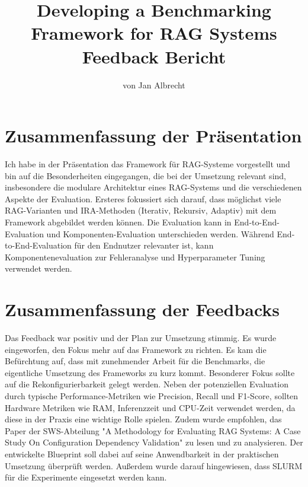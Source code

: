 \documentclass[letterpaper, 10 pt, conference]{ieeeconf}
\title{\LARGE \bf
Developing a Benchmarking Framework for RAG Systems \newline Feedback Bericht
}
\author{von Jan Albrecht}
\begin{document}
\maketitle
\thispagestyle{plain}
\pagestyle{plain}

\section{Zusammenfassung der Präsentation}
Ich habe in der Präsentation das Framework für RAG-Systeme vorgestellt und bin auf die Besonderheiten eingegangen, die bei der Umsetzung relevant sind, insbesondere die modulare Architektur eines RAG-Systems und die verschiedenen Aspekte der Evaluation. 
Ersteres fokussiert sich darauf, dass möglichst viele RAG-Varianten und IRA-Methoden (Iterativ, Rekursiv, Adaptiv) mit dem Framework abgebildet werden können.
Die Evaluation kann in End-to-End-Evaluation und Komponenten-Evaluation unterschieden werden. 
Während End-to-End-Evaluation für den Endnutzer relevanter ist, kann Komponentenevaluation zur Fehleranalyse und Hyperparameter Tuning verwendet werden.\\


\section{Zusammenfassung der Feedbacks}
Das Feedback war positiv und der Plan zur Umsetzung stimmig. 
Es wurde eingeworfen, den Fokus mehr auf das Framework zu richten.
Es kam die Befürchtung auf, dass mit zunehmender Arbeit für die Benchmarks, die eigentliche Umsetzung des Frameworks zu kurz kommt. Besonderer Fokus sollte auf die Rekonfigurierbarkeit gelegt werden.
Neben der potenziellen Evaluation durch typische Performance-Metriken wie Precision, Recall und F1-Score, sollten Hardware Metriken wie RAM, Inferenzzeit und CPU-Zeit verwendet werden, da diese in der Praxis eine wichtige Rolle spielen.
Zudem wurde empfohlen, das Paper der SWS-Abteilung "A Methodology for Evaluating RAG Systems: A Case Study On Configuration Dependency Validation" zu lesen und zu analysieren. Der entwickelte Blueprint soll dabei auf seine Anwendbarkeit in der praktischen Umsetzung überprüft werden.
Außerdem wurde darauf hingewiesen, dass SLURM für die Experimente eingesetzt werden kann.\\
\end{document}
